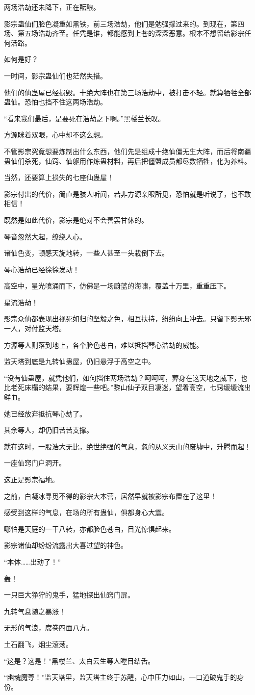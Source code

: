 \begin{this_body}
两场浩劫还未降下，正在酝酿。

影宗蛊仙们脸色凝重如黑铁，前三场浩劫，他们是勉强撑过来的。到现在，第四场、第五场浩劫齐至。任凭是谁，都能感到上苍的深深恶意。根本不想留给影宗任何活路。

如何是好？

一时间，影宗蛊仙们也茫然失措。

他们的仙蛊屋已经损毁。十绝大阵也在第三场浩劫中，被打击不轻。就算牺牲全部蛊仙。恐怕也挡不住这两场浩劫。

“看来我们最后，是要死在浩劫之下啊。”黑楼兰长叹。

方源眯着双眼，心中却不这么想。

不管影宗究竟想要炼制出什么东西，他们先是组成十绝仙僵无生大阵，而后将南疆蛊仙们杀死，仙窍、仙躯用作炼蛊材料，再后把僵盟成员都尽数牺牲，化为养料。

当然，还要算上损失的七座仙蛊屋！

影宗付出的代价，简直是骇人听闻，若非方源亲眼所见，恐怕就是听说了，也不敢相信！

既然是如此代价，影宗是绝对不会善罢甘休的。

琴音忽然大起，缭绕人心。

诸仙色变，顿感天旋地转，一些人甚至一头栽倒下去。

琴心浩劫已经徐徐发动！

高空中，星光喷涌而下，仿佛是一场蔚蓝的海啸，覆盖十万里，重重压下。

星流浩劫！

影宗众仙都表现出视死如归的坚毅之色，相互扶持，纷纷向上冲去。只留下影无邪一人，对付监天塔。

方源等人则落到地上，各个脸色苍白，难以抵挡琴心浩劫的威能。

监天塔到底是九转仙蛊屋，仍旧悬浮于高空之中。

“没有仙蛊屋，就凭他们，如何挡住两场浩劫？呵呵呵，葬身在这天地之威下，也比老死床榻的结果，要辉煌一些吧。”黎山仙子双目凄迷，望着高空，七窍缓缓流出鲜血。

她已经放弃抵抗琴心劫了。

其余等人，却仍旧苦苦支撑。

就在这时，一股浩大无比，绝世绝强的气息，忽的从义天山的废墟中，升腾而起！

一座仙窍门户洞开。

这正是影宗福地。

之前，白凝冰寻觅不得的影宗大本营，居然早就被影宗布置在了这里！

感受到这样的气息，在场的所有蛊仙，俱都身心大震。

哪怕是天庭的一干八转，亦都脸色苍白，目光惊惧起来。

影宗诸仙却纷纷流露出大喜过望的神色。

“本体……出动了！”

轰！

一只巨大狰狞的鬼手，猛地探出仙窍门扉。

九转气息随之暴涨！

无形的气浪，席卷四面八方。

土石翻飞，烟尘滚荡。

“这是？这是！”黑楼兰、太白云生等人瞠目结舌。

“幽魂魔尊！”监天塔里，监天塔主终于苏醒，心中压力如山，一口道破鬼手的身份。

\end{this_body}

